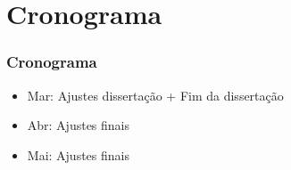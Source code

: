 \documentclass[10pt]{beamer}
\theoremstyle{remark}
\theoremstyle{definition}
\begin{document}
	\section{Cronograma}
	\begin{frame}[allowframebreaks]
		\frametitle{Cronograma}
		
		\begin{itemize}
			\item Mar: Ajustes dissertação + Fim da dissertação
			\item Abr: Ajustes finais
			\item Mai: Ajustes finais
		\end{itemize}
		
	\end{frame}
	
\end{document}
